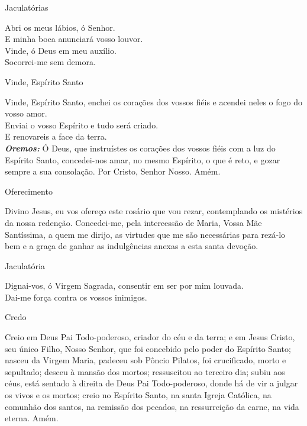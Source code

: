 \documentclass{book}
\begin{document}
\begin{center}
    Jaculatórias
\end{center}
\begin{flushleft}
    \VbarRed{} Abri os meus lábios, ó Senhor. \\
    \RbarRed{} E minha boca anunciará vosso louvor.
    \vspace{.2cm} \\
    \VbarRed{} Vinde, ó Deus em meu auxílio. \\
    \RbarRed{} Socorrei-me sem demora.
\end{flushleft}
\begin{center}
    Vinde, Espírito Santo
\end{center}
\begin{flushleft}
    Vinde, Espírito Santo, enchei os corações dos vossos fiéis e acendei neles o fogo do vosso amor. \\
    \VbarRed{} Enviai o vosso Espírito e tudo será criado. \\
    \RbarRed{} E renovareis a face da terra.
    \vspace{.2cm} \\
    \textbf{\textit{Oremos:}} Ó Deus, que instruístes os corações dos vossos fiéis com a luz do Espírito Santo, concedei-nos amar, no mesmo Espírito, o que é reto, e gozar sempre a sua consolação. Por Cristo, Senhor Nosso. Amém. \\
\end{flushleft}
\begin{center}
    Oferecimento
\end{center}
\begin{flushleft}
    Divino Jesus, eu vos ofereço este rosário que vou rezar, contemplando os mistérios da nossa redenção. Concedei-me, pela intercessão de Maria, Vossa Mãe Santíssima, a quem me dirijo, as virtudes que me são necessárias para rezá-lo bem e a graça de ganhar as indulgências anexas a esta santa devoção.
\end{flushleft}
\begin{center}
    Jaculatória
\end{center}
\begin{flushleft}
    \VbarRed{} Dignai-vos, ó Virgem Sagrada, consentir em ser por mim louvada. \\
    \RbarRed{} Dai-me força contra os vossos inimigos.
\end{flushleft}
\begin{center}
    Credo
\end{center}
\begin{flushleft}
    Creio em Deus Pai Todo-poderoso, criador do céu e da terra; e em Jesus Cristo, seu único Filho, Nosso Senhor, que foi concebido pelo poder do Espírito Santo; nasceu da Virgem Maria, padeceu sob Pôncio Pilatos, foi crucificado, morto e sepultado; desceu à mansão dos mortos; ressuscitou ao terceiro dia; subiu aos céus, está sentado à direita de Deus Pai Todo-poderoso, donde há de vir a julgar os vivos e os mortos; creio no Espírito Santo, na santa Igreja Católica, na comunhão dos santos, na remissão dos pecados, na ressurreição da carne, na vida eterna. Amém.
\end{flushleft}
\end{document}
